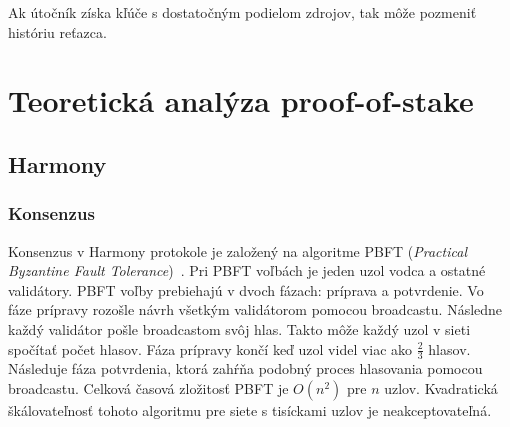 Ak útočník získa kľúče s dostatočným podielom zdrojov, tak môže pozmeniť históriu reťazca. 

\chapter{Teoretická analýza proof-of-stake}

\section{Harmony}

\subsection{Konsenzus}

Konsenzus v Harmony protokole je založený na algoritme PBFT (\textit{Practical Byzantine Fault Tolerance})~\cite{pbftCastro}. Pri PBFT voľbách je jeden uzol vodca a ostatné validátory. PBFT voľby prebiehajú v dvoch fázach: príprava a potvrdenie. Vo fáze prípravy rozošle návrh všetkým validátorom pomocou broadcastu. Následne každý validátor pošle broadcastom svôj hlas. Takto môže každý uzol v sieti spočítať počet hlasov. Fáza prípravy končí keď uzol videl viac ako $\frac{2}{3}$ hlasov. Následuje fáza potvrdenia, ktorá zahŕňa podobný proces hlasovania pomocou broadcastu. Celková časová zložitosť PBFT je $O(n^2)$ pre $n$ uzlov. Kvadratická škálovateľnosť tohoto algoritmu pre siete s tisíckami uzlov je neakceptovateľná.

